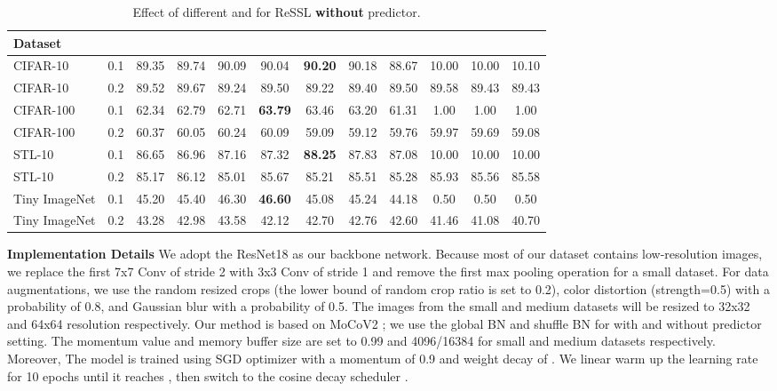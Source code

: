 \documentclass{article}
\newcommand{\<}{\left\langle}
\renewcommand{\>}{\right\rangle}
\begin{document}
\renewcommand\arraystretch{1.0}
\begin{table*}[h]
 \centering
 \setlength\tabcolsep{3pt}
 \caption{Effect of different  and  for ReSSL \textbf{without} predictor.}
 \vspace{-10pt}
 \label{table:ablation_t}
\begin{tabular}{l c c c c c c c c c c c} 
\toprule 
Dataset        &  &  &  &  &  &  &  &  &   &   &  \\  \hline
CIFAR-10       & 0.1 & 89.35  & 89.74 & 90.09 & 90.04 & \textbf{90.20} & 90.18 & 88.67 &  \textcolor{collapsed}{10.00} &  \textcolor{collapsed}{10.00} & \textcolor{collapsed}{10.10} \\
CIFAR-10       & 0.2 & 89.52  & 89.67 & 89.24 & 89.50 & 89.22 & 89.40 & 89.50 & 89.58 & 89.43 & 89.43 \\ \hline
CIFAR-100      & 0.1 & 62.34  & 62.79 & 62.71 & \textbf{63.79} & 63.46 & 63.20 & 61.31 &  \textcolor{collapsed}{1.00} &  \textcolor{collapsed}{1.00} &  \textcolor{collapsed}{1.00} \\
CIFAR-100      & 0.2 & 60.37  & 60.05 & 60.24 & 60.09 & 59.09 & 59.12 & 59.76 & 59.97 & 59.69 & 59.08 \\ \hline
STL-10         & 0.1 & 86.65  & 86.96 & 87.16 & 87.32 & \textbf{88.25} & 87.83 & 87.08 & \textcolor{collapsed}{10.00} &  \textcolor{collapsed}{10.00} &  \textcolor{collapsed}{10.00} \\
STL-10         & 0.2 & 85.17  & 86.12 & 85.01 & 85.67 & 85.21 & 85.51 & 85.28 & 85.93 & 85.56 & 85.58 \\ \hline
Tiny ImageNet  & 0.1 & 45.20  & 45.40 & 46.30 & \textbf{46.60} & 45.08 & 45.24 & 44.18 &  \textcolor{collapsed}{0.50} &  \textcolor{collapsed}{0.50} &  \textcolor{collapsed}{0.50} \\
Tiny ImageNet  & 0.2 & 43.28  & 42.98 & 43.58 & 42.12 & 42.70 & 42.76 & 42.60 & 41.46 & 41.08 & 40.70 \\
\bottomrule 
\end{tabular}
\vspace{-10pt}
\end{table*}




\textbf{Implementation Details}
We adopt the ResNet18 \cite{resnet} as our backbone network. Because most of our dataset contains low-resolution images, we replace the first 7x7 Conv of stride 2 with 3x3 Conv of stride 1 and remove the first max pooling operation for a small dataset. For data augmentations, we use the random resized crops (the lower bound of random crop ratio is set to 0.2), color distortion (strength=0.5) with a probability of 0.8, and Gaussian blur with a probability of 0.5. The images from the small and medium datasets will be resized to 32x32 and 64x64 resolution respectively. Our method is based on MoCoV2 \cite{mocov2}; we use the global BN and shuffle BN  for with and without predictor setting. The momentum value and memory buffer size are set to 0.99 and 4096/16384 for small and medium datasets respectively. Moreover, The model is trained using SGD optimizer with a momentum of 0.9 and weight decay of . We linear warm up the learning rate for 10 epochs until it reaches , then switch to the cosine decay scheduler  \cite{cosine_lr}.
\end{document}
